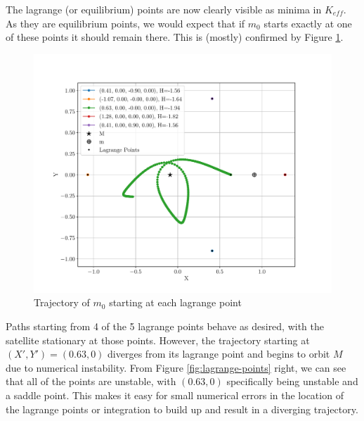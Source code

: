 \documentclass[11pt]{article}
\begin{document}
\noindent
The lagrange (or equilibrium) points are now clearly visible as minima in $K_{eff}$. As they are equilibrium points, we would expect that if $m_0$ starts exactly at one of these points it should remain there. This is (mostly) confirmed by Figure \ref{fig:lagrange-point-orbit}.
\begin{figure}[H]
    \centering
    \includegraphics[width=0.6\linewidth]{figures/lagrange_point_orbit.pdf}
    \caption{Trajectory of $m_0$ starting at each lagrange point}
    \label{fig:lagrange-point-orbit}
\end{figure}
\noindent
Paths starting from 4 of the 5 lagrange points behave as desired, with the satellite stationary at those points. However, the trajectory starting at $(X', Y') = (0.63, 0)$ diverges from its lagrange point and begins to orbit $M$ due to numerical instability. From Figure \ref{fig:lagrange-points} right, we can see that all of the points are unstable, with $(0.63, 0)$ specifically being unstable and a saddle point. This makes it easy for small numerical errors in the location of the lagrange points or integration to build up and result in a diverging trajectory.
\end{document}
